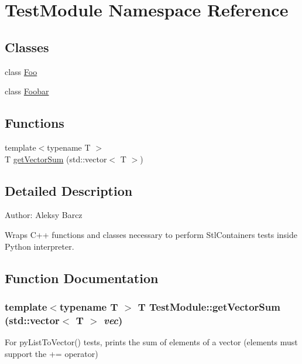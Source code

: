 \hypertarget{namespace_test_module}{
\section{TestModule Namespace Reference}
\label{namespace_test_module}
}
\subsection*{Classes}
\begin{DoxyCompactItemize}
\item 
class \hyperlink{class_test_module_1_1_foo}{Foo}
\item 
class \hyperlink{class_test_module_1_1_foobar}{Foobar}
\end{DoxyCompactItemize}
\subsection*{Functions}
\begin{DoxyCompactItemize}
\item 
{\footnotesize template$<$typename T $>$ }\\T \hyperlink{namespace_test_module_ae475485e78afae40f71427c30f4e510b}{getVectorSum} (std::vector$<$ T $>$)
\end{DoxyCompactItemize}


\subsection{Detailed Description}
Author: Aleksy Barcz

Wraps C++ functions and classes necessary to perform StlContainers tests inside Python interpreter. 

\subsection{Function Documentation}
\hypertarget{namespace_test_module_ae475485e78afae40f71427c30f4e510b}{
\subsubsection[{getVectorSum}]{\setlength{\rightskip}{0pt plus 5cm}template$<$typename T $>$ T TestModule::getVectorSum (std::vector$<$ T $>$ {\em vec})}}
\label{namespace_test_module_ae475485e78afae40f71427c30f4e510b}
For pyListToVector() tests, prints the sum of elements of a vector (elements must support the += operator) 